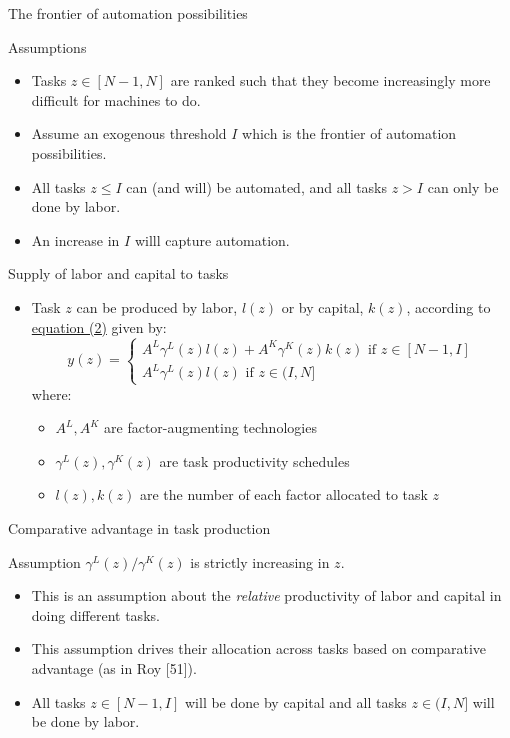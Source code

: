 \documentclass[notes=show]{beamer}
\begin{document}
\begin{frame}{The frontier of automation possibilities}
\begin{block}{Assumptions}
\begin{itemize}
\item Tasks $z \in [N-1,N]$ are ranked such that they become increasingly more difficult for machines to do. \medskip
\item Assume an exogenous threshold $I$ which is the frontier of automation possibilities. \medskip
\item All tasks $z \leq I$ can (and will) be automated, and all tasks $z > I $ can only be done by labor. \medskip
\item An increase in $I$ willl capture automation. 
\end{itemize}
\end{block}
\end{frame}

\begin{frame}{Supply of labor and capital to tasks}
\begin{itemize}
\item Task $z$ can be produced by labor, $l(z)$ or by capital, $k(z)$, according to \underline{equation (2)} given by:
\[
y(z) = 
\begin{cases}
A^{L} \gamma^{L}(z)l(z) + A^{K} \gamma^{K}(z)k(z) \text{ if } z \in [N-1,I]\\
A^{L} \gamma^{L}(z)l(z) \text{ if } z \in (I,N] 
\end{cases} \label{eq2}
\]
where:
\begin{itemize}
\item $A^{L}, A^{K}$ are factor-augmenting technologies \medskip
\item $ \gamma^{L}(z), \gamma^{K}(z)$ are task productivity schedules \medskip
\item $ l(z), k(z)$ are the number of each factor allocated to task $z$
\end{itemize}
\end{itemize}
\end{frame}

\begin{frame}{Comparative advantage in task production}
\begin{block}{Assumption}
$ \gamma^{L}(z)/\gamma^{K}(z)$ is strictly increasing in $z$.
\end{block}
\begin{itemize}
\item This is an assumption about the \textit{relative} productivity of labor and capital in doing different tasks. \medskip
\item This assumption drives their allocation across tasks based on comparative advantage (as in Roy [51]).\medskip
\item All tasks $z \in [N-1,I]$ will be done by capital and all tasks $z \in (I,N]$ will be done by labor. 
\end{itemize}
\end{frame}
\end{document}
